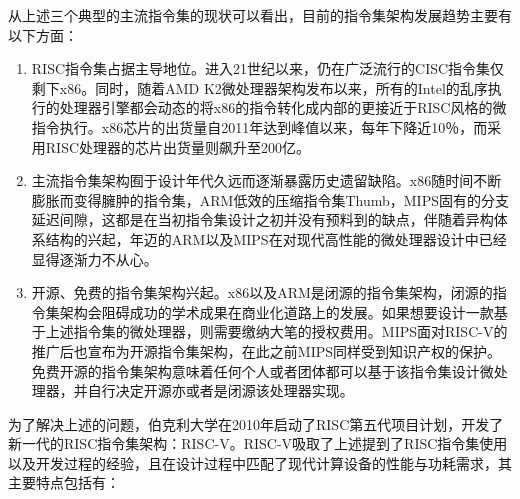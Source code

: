 从上述三个典型的主流指令集的现状可以看出，目前的指令集架构发展趋势主要有以下方面：

\begin{enumerate}
	\item RISC指令集占据主导地位。进入21世纪以来，仍在广泛流行的CISC指令集仅剩下x86。同时，随着AMD K2微处理器架构发布以来，所有的Intel的乱序执行的处理器引擎都会动态的将x86的指令转化成内部的更接近于RISC风格的微指令执行。x86芯片的出货量自2011年达到峰值以来，每年下降近10％，而采用RISC处理器的芯片出货量则飙升至200亿。
	\item 主流指令集架构囿于设计年代久远而逐渐暴露历史遗留缺陷。x86随时间不断膨胀而变得臃肿的指令集，ARM低效的压缩指令集Thumb，MIPS固有的分支延迟间隙，这都是在当初指令集设计之初并没有预料到的缺点，伴随着异构体系结构的兴起，年迈的ARM以及MIPS在对现代高性能的微处理器设计中已经显得逐渐力不从心。
	\item 开源、免费的指令集架构兴起。x86以及ARM是闭源的指令集架构，闭源的指令集架构会阻碍成功的学术成果在商业化道路上的发展。如果想要设计一款基于上述指令集的微处理器，则需要缴纳大笔的授权费用。MIPS面对RISC-V的推广后也宣布为开源指令集架构，在此之前MIPS同样受到知识产权的保护。免费开源的指令集架构意味着任何个人或者团体都可以基于该指令集设计微处理器，并自行决定开源亦或者是闭源该处理器实现。
\end{enumerate}

为了解决上述的问题，伯克利大学在2010年启动了RISC第五代项目计划，开发了新一代的RISC指令集架构：RISC-V。RISC-V吸取了上述提到了RISC指令集使用以及开发过程的经验，且在设计过程中匹配了现代计算设备的性能与功耗需求，其主要特点包括有：

